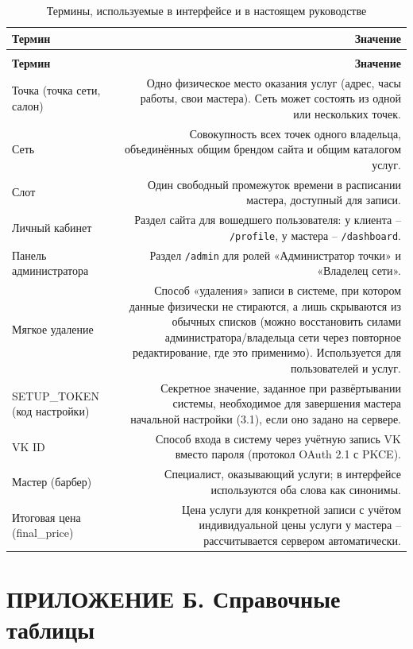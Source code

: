 \begin{xltabular}{\textwidth}{|>{\raggedright\arraybackslash}p{4cm}|D|}
\caption{Термины, используемые в интерфейсе и в настоящем руководстве} \\
\hline
\textbf{Термин} & \textbf{Значение} \\
\hline
\endfirsthead
\hline
{}\\
\hline
\textbf{Термин} & \textbf{Значение} \\
\hline
\endhead
\hline
\endfoot
Точка (точка сети, салон) & Одно физическое место оказания услуг
  (адрес, часы работы, свои мастера). Сеть может состоять из одной или
  нескольких точек. \\
\hline
Сеть & Совокупность всех точек одного владельца, объединённых общим
  брендом сайта и общим каталогом услуг. \\
\hline
Слот & Один свободный промежуток времени в расписании мастера,
  доступный для записи. \\
\hline
Личный кабинет & Раздел сайта для вошедшего пользователя: у клиента --
  \texttt{/profile}, у мастера -- \texttt{/dashboard}. \\
\hline
Панель администратора & Раздел \texttt{/admin} для ролей «Администратор
  точки» и «Владелец сети». \\
\hline
Мягкое удаление & Способ «удаления» записи в системе, при котором данные
  физически не стираются, а лишь скрываются из обычных списков (можно
  восстановить силами администратора/владельца сети через повторное
  редактирование, где это применимо). Используется для пользователей и
  услуг. \\
\hline
SETUP\_TOKEN (код настройки) & Секретное значение, заданное при
  развёртывании системы, необходимое для завершения мастера начальной
  настройки (3.1), если оно задано на сервере. \\
\hline
VK ID & Способ входа в систему через учётную запись VK вместо пароля
  (протокол OAuth 2.1 с PKCE). \\
\hline
Мастер (барбер) & Специалист, оказывающий услуги; в интерфейсе
  используются оба слова как синонимы. \\
\hline
Итоговая цена (final\_price) & Цена услуги для конкретной записи с
  учётом индивидуальной цены услуги у мастера -- рассчитывается сервером
  автоматически. \\
\end{xltabular}

\section*{ПРИЛОЖЕНИЕ Б. Справочные таблицы}

